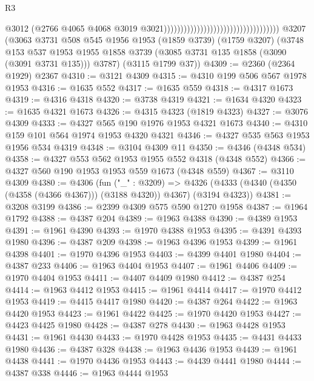 \begin{lexlean}{R3}
\begin{coremodule}
                                                                        @3012
                                                                        (@2766
                                                                          @4065
                                                                          @4068
                                                                          @3019
                                                                          @3021)))))))))))))))))))))))))))))))))))
    @3207
    (@3063
      @3731
      @508
      @545
      @1956
      @1953
      (@1859 @3739)
      (@1759 @3207)
      (@3748
        @153
        @537
        @1953
        @1955
        @1858
        @3739
        (@3085 @3731 @135 @1858 (@3090 (@3091 @3731 @135)))
        @3787)
      (@3115 @1799 @37))
@4309 := @2360 (@2364 @1929) @2367
@4310 := @3121 @4309
@4315 := @4310 @199 @506 @567 @1978 @1953
@4316 := @1635 @552
@4317 := @1635 @559
@4318 := @4317 @1673
@4319 := @4316 @4318
@4320 := @3738 @4319
@4321 := @1634 @4320
@4323 := @1635 @4321 @1673
@4326 := @4315 @4323 (@1819 @4323)
@4327 := @3076 @4309
@4333 := @4327 @565 @190 @1976 @1953 @4321 @1673
@4340 := @4310 @159 @101 @564 @1974 @1953 @4320 @4321
@4346 := @4327 @535 @563 @1953 @1956 @534 @4319
@4348 := @3104 @4309 @11
@4350 := @4346 (@4348 @534)
@4358 := @4327 @553 @562 @1953 @1955 @552 @4318 (@4348 @552)
@4366 := @4327 @560 @190 @1953 @1953 @559 @1673 (@4348 @559)
@4367 := @3110 @4309
@4380 := @4306
    (fun ("_" : @3209) =>
    @4326 (@4333 (@4340 (@4350 (@4358 (@4366 @4367))) (@3188 @4320)) @4367) (@3194 @4323))
@4381 := @3208 @3199
@4386 := @2399 @4309 @575 @590 @1270 @1958
@4387 := @1964 @1792
@4388 := @4387 @204
@4389 := @1963 @4388
@4390 := @4389 @1953
@4391 := @1961 @4390
@4393 := @1970 @4388 @1953
@4395 := @4391 @4393 @1980
@4396 := @4387 @209
@4398 := @1963 @4396 @1953
@4399 := @1961 @4398
@4401 := @1970 @4396 @1953
@4403 := @4399 @4401 @1980
@4404 := @4387 @233
@4406 := @1963 @4404 @1953
@4407 := @1961 @4406
@4409 := @1970 @4404 @1953
@4411 := @4407 @4409 @1980
@4412 := @4387 @254
@4414 := @1963 @4412 @1953
@4415 := @1961 @4414
@4417 := @1970 @4412 @1953
@4419 := @4415 @4417 @1980
@4420 := @4387 @264
@4422 := @1963 @4420 @1953
@4423 := @1961 @4422
@4425 := @1970 @4420 @1953
@4427 := @4423 @4425 @1980
@4428 := @4387 @278
@4430 := @1963 @4428 @1953
@4431 := @1961 @4430
@4433 := @1970 @4428 @1953
@4435 := @4431 @4433 @1980
@4436 := @4387 @328
@4438 := @1963 @4436 @1953
@4439 := @1961 @4438
@4441 := @1970 @4436 @1953
@4443 := @4439 @4441 @1980
@4444 := @4387 @338
@4446 := @1963 @4444 @1953

\end{coremodule}
\end{lexlean}
